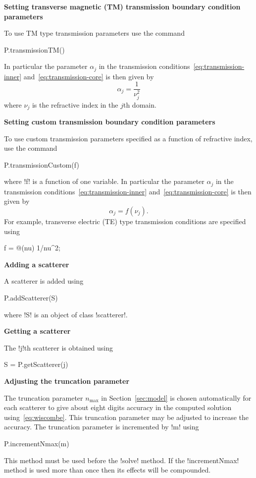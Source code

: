 \documentclass[11pt,letterpaper]{article}
\newcommand{\nmax}{n_\mathrm{max}}
\newcommand{\techheading}[1]{%
    \par\vspace{-0.3\parskip}\noindent\hspace{-1cm}\textbf{#1}%
    \par\vspace{-0.5\parskip}\noindent\nopagebreak\ignorespaces}
\begin{document}
\techheading{Setting transverse magnetic (TM)
transmission boundary condition parameters}
To use TM type transmission parameters use the command
\begin{matlab}
P.transmissionTM()
\end{matlab}
In particular the parameter $\alpha_j$
in the transmission
conditions~\eqref{eq:transmission-inner}
and~\eqref{eq:transmission-core} is then given by
\begin{displaymath}
\alpha_j = \frac{1}{\nu_j^2}
\end{displaymath}
where $\nu_j$ is the refractive index in the $j$th domain.

\techheading{Setting custom transmission boundary condition parameters}
To use 
custom transmission parameters specified as a function of
refractive index, use the command
\begin{matlab}
P.transmissionCustom(f)
\end{matlab}
where !f! is a function of one variable.
In particular the parameter $\alpha_j$
in the transmission
conditions~\eqref{eq:transmission-inner}
and~\eqref{eq:transmission-core} is then given by
\begin{displaymath}
\alpha_j = f(\nu_j).
\end{displaymath}
For example, transverse electric (TE) type transmission conditions are
specified using
\begin{matlab}
f = @(nu) 1/nu^2;
\end{matlab}


\techheading{Adding a scatterer}
A scatterer is added using
\begin{matlab}
P.addScatterer(S)
\end{matlab}
where !S! is an object of class !scatterer!.

\techheading{Getting a scatterer}
The !j!th scatterer is obtained using
\begin{matlab}
S = P.getScatterer(j)
\end{matlab}

\techheading{Adjusting the truncation parameter}
The truncation parameter $\nmax$ in Section~\ref{sec:model} is chosen
automatically for each scatterer
to give about eight digits accuracy in the computed
solution using~\eqref{eq:wiscombe}.
This truncation parameter may be adjusted to increase the accuracy.
The truncation parameter is incremented by !m! using
\begin{matlab}
P.incrementNmax(m)
\end{matlab}
This method must be used before the !solve! method.
If the !incrementNmax! method is used more than once then its effects
will be compounded.
\end{document}
